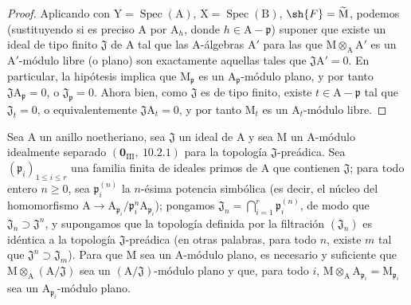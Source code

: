 \begin{proof}
Aplicando  con $\mathrm{Y}=\operatorname{Spec}(\mathrm{A})$, $\mathrm{X}=\operatorname{Spec}(\mathrm{B})$, $\sh{F}=\widetilde{\mathrm{M}}$, podemos (sustituyendo
si es preciso $\mathrm{A}$ por $\mathrm{A}_h$, donde $h\in\mathrm{A}-\mathfrak{p}$) suponer que existe un ideal de tipo finito $\mathfrak{J}$ de $\mathrm{A}$
tal que las $\mathrm{A}$-álgebras $\mathrm{A}'$ para las que $\mathrm{M}\otimes_\mathrm{A}\mathrm{A}'$ es un $\mathrm{A}'$-módulo libre (o plano) son
exactamente aquellas tales que $\mathfrak{J}\mathrm{A}'=0$. En particular, la hipótesis implica que $\mathrm{M}_\mathfrak{p}$ es un
$\mathrm{A}_\mathfrak{p}$-módulo plano, y por tanto $\mathfrak{J}\mathrm{A}_\mathfrak{p}=0$, o $\mathfrak{J}_\mathfrak{p}=0$. Ahora bien, como $\mathfrak{J}$ es de tipo finito,
existe $t\in\mathrm{A}-\mathfrak{p}$ tal que $\mathfrak{J}_t=0$, o equivalentemente $\mathfrak{J}\mathrm{A}_t=0$, y por tanto $\mathrm{M}_t$ es un $\mathrm{A}_t$-módulo libre.
\end{proof}

\begin{proposition}[11.4.7]
\label{IV.11.4.7}
Sea $\mathrm{A}$ un anillo noetheriano, sea $\mathfrak{J}$ un ideal de $\mathrm{A}$ y sea $\mathrm{M}$ un $\mathrm{A}$-módulo
idealmente separado $(\mathbf{0}_{\mathrm{III}},~10.2.1)$ para la topología $\mathfrak{J}$-preádica. Sea $(\mathfrak{p}_i)_{1\leq i\leq r}$ una familia finita
de ideales primos de $\mathrm{A}$ que contienen $\mathfrak{J}$; para todo entero $n\geq 0$, sea $\mathfrak{p}_i^{(n)}$ la $n$-ésima
potencia simbólica (es decir, el núcleo del homomorfismo $\mathrm{A}\to\mathrm{A}_{\mathfrak{p}_i}/\mathfrak{p}_i^n\mathrm{A}_{\mathfrak{p}_i}$); pongamos $\mathfrak{J}_n=\bigcap_{i=1}^{r}\mathfrak{p}_i^{(n)}$, de modo que $\mathfrak{J}_n\supset\mathfrak{J}^n$,
y supongamos que la topología definida por la filtración $(\mathfrak{J}_n)$ es idéntica a la topología $\mathfrak{J}$-preádica
(en otras palabras, para todo $n$, existe $m$ tal que $\mathfrak{J}^n\supset\mathfrak{J}_m$). Para que $\mathrm{M}$ sea un $\mathrm{A}$-módulo plano,
es necesario y suficiente que $\mathrm{M}\otimes_\mathrm{A}(\mathrm{A}/\mathfrak{J})$ sea un $(\mathrm{A}/\mathfrak{J})$-módulo plano y que, para todo $i$, $\mathrm{M}\otimes_\mathrm{A}\mathrm{A}_{\mathfrak{p}_i}=\mathrm{M}_{\mathfrak{p}_i}$
sea un $\mathrm{A}_{\mathfrak{p}_i}$-módulo plano.
\end{proposition}

